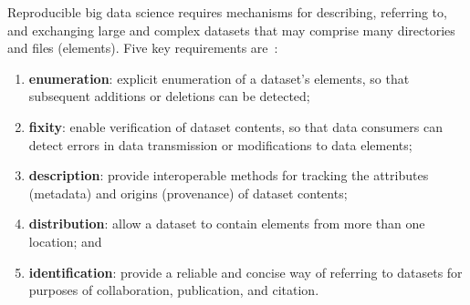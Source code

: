 \documentclass[11pt]{article}
\begin{document}
Reproducible big data science requires mechanisms for describing, referring to, and exchanging large  and complex datasets that may comprise many directories and files (elements).
Five key requirements are~\cite{chard16}:
\begin{enumerate}
\item
\textbf{enumeration}: explicit enumeration of a dataset's elements, so that
subsequent additions or deletions can be detected; 
\item
\textbf{fixity}: enable verification of dataset contents, so that data consumers can detect errors in data transmission or modifications to data elements; 
\item
\textbf{description}: provide interoperable methods for tracking the attributes (metadata) and origins (provenance) of dataset contents; 
\item
\textbf{distribution}: allow a dataset to contain elements from more than one location; and
\item
\textbf{identification}: provide a reliable and concise way of referring to datasets for purposes of collaboration, publication, and citation.
\end{enumerate}

\end{document}
